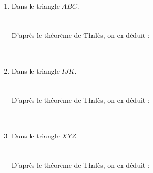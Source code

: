 \documentclass[12pt]{article}
\begin{document}
\begin{multicols}{3}
  \begin{enumerate}
  \item Dans le triangle $ABC$.\\ 
  \phantom{abc}\\
  \phantom{abc}\\
  D'après le théorème de Thalès, on en déduit :\\
   \phantom{abc}\\
  \phantom{abc}\\
  \item Dans le triangle $IJK$.\\ 
  \phantom{abc}\\
  \phantom{abc}\\
  D'après le théorème de Thalès, on en déduit :\\
  \phantom{abc}\\
  \phantom{abc}\\
  \item Dans le triangle $XYZ$\\
  \phantom{abc}\\
  \phantom{abc}\\
  D'après le théorème de Thalès, on en déduit :\\
  \phantom{abc}\\
  \phantom{abc}\\
  \end{enumerate}
\end{multicols}
\end{document}

